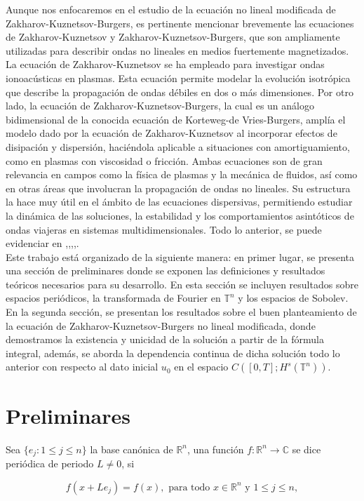 \documentclass[12pt]{article}
\newcommand\R{\ensuremath{\mathbb{R}}}
\newcommand\T{\mathbb{T}}
\begin{document}
Aunque nos enfocaremos en el estudio de la ecuación no lineal modificada de Zakharov-Kuznetsov-Burgers, es pertinente mencionar brevemente las ecuaciones de Zakharov-Kuznetsov y Zakharov-Kuznetsov-Burgers, que son ampliamente utilizadas para describir ondas no lineales en medios fuertemente magnetizados. La ecuación de Zakharov-Kuznetsov se ha empleado para investigar ondas ionoacústicas en plasmas. Esta ecuación permite modelar la evolución isotrópica que describe la propagación de ondas débiles en dos o más dimensiones. Por otro lado, la ecuación de Zakharov-Kuznetsov-Burgers, la cual es un análogo bidimensional de la conocida ecuación de Korteweg-de Vries-Burgers, amplía el modelo dado por la ecuación de Zakharov-Kuznetsov  al incorporar efectos de disipación y dispersión, haciéndola aplicable a situaciones con amortiguamiento, como en plasmas con viscosidad o fricción. Ambas ecuaciones son de gran relevancia en campos como la física de plasmas y la mecánica de fluidos, así como en otras áreas que involucran la propagación de ondas no lineales. Su estructura la hace muy útil en el ámbito de las ecuaciones dispersivas, permitiendo estudiar la dinámica de las soluciones, la estabilidad y los comportamientos asintóticos de ondas viajeras en sistemas multidimensionales. Todo lo anterior, se puede evidenciar en \cite{texto1},\cite{texto2},\cite{texto3},\cite{texto4},\cite{texto5}.\\

Este trabajo está organizado de la siguiente manera: en primer lugar, se presenta una sección de preliminares donde se exponen las definiciones y resultados teóricos necesarios para su desarrollo. En esta sección se incluyen resultados sobre espacios periódicos, la transformada de Fourier en $ \T^n$  y los espacios de Sobolev. En la segunda sección, se presentan los resultados sobre el buen planteamiento de la ecuación de Zakharov-Kuznetsov-Burgers no lineal modificada, donde demostramos la existencia y unicidad de la solución a partir de la fórmula integral, además, se aborda la dependencia continua de dicha solución todo lo anterior con respecto al dato inicial $ u_0$ en el espacio $C([0, T]; H^s(\T^n))$.







\section{Preliminares}

\begin{definition}
 Sea $\{e_j:  1\leq j\leq n\}$ la base canónica de $\R^n$, una función $f: \mathbb{R}^n \rightarrow \mathbb{C}$ se dice periódica de periodo $L \neq 0$, si

$$
f(x+L e_j)=f(x), \text { para todo } x \in \mathbb{R}^n \text{ y } 1\leq j\leq n, 
$$


\end{definition}
\end{document}
